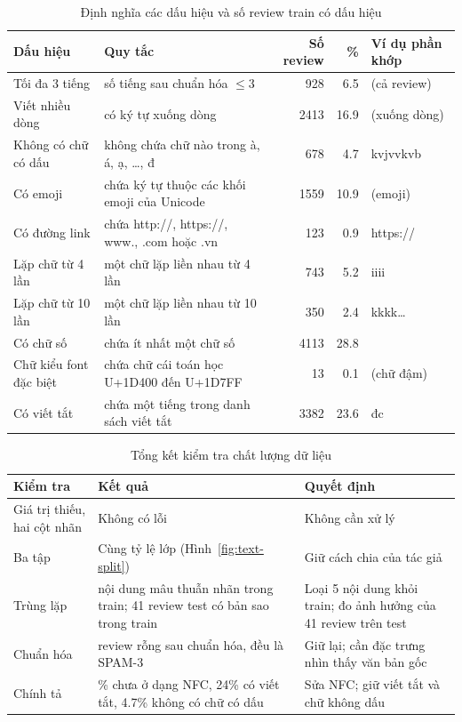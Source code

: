 \begin{table}[H]
\centering
\caption{Định nghĩa các dấu hiệu và số review train có dấu hiệu}
\label{tab:text-signals}
\small
\begin{tabular}{>{\raggedright\arraybackslash}p{3.4cm}>{\raggedright\arraybackslash}p{6.4cm}rr>{\raggedright\arraybackslash}p{2.0cm}}
\toprule
Dấu hiệu & Quy tắc & Số review & \% & Ví dụ phần khớp\\
\midrule
Tối đa 3 tiếng & số tiếng sau chuẩn hóa $\le 3$ & 928 & 6.5 & (cả review)\\
Viết nhiều dòng & có ký tự xuống dòng & 2413 & 16.9 & (xuống dòng)\\
Không có chữ có dấu & không chứa chữ nào trong à, á, ạ, \ldots, đ & 678 & 4.7 & kvjvvkvb\\
Có emoji & chứa ký tự thuộc các khối emoji của Unicode & 1559 & 10.9 & (emoji)\\
Có đường link & chứa http://, https://, www., .com hoặc .vn & 123 & 0.9 & https://\\
Lặp chữ từ 4 lần & một chữ lặp liền nhau từ 4 lần & 743 & 5.2 & iiii\\
Lặp chữ từ 10 lần & một chữ lặp liền nhau từ 10 lần & 350 & 2.4 & kkkk\ldots\\
Có chữ số & chứa ít nhất một chữ số & 4113 & 28.8 & 1\\
Chữ kiểu font đặc biệt & chứa chữ cái toán học U+1D400 đến U+1D7FF & 13 & 0.1 & (chữ đậm)\\
Có viết tắt & chứa một tiếng trong danh sách viết tắt & 3382 & 23.6 & đc\\
\bottomrule
\end{tabular}
\end{table}

\begin{table}[H]
\centering
\caption{Tổng kết kiểm tra chất lượng dữ liệu}
\label{tab:text-quality}
\small
\begin{tabular}{>{\raggedright\arraybackslash}p{3.6cm}>{\raggedright\arraybackslash}p{5.4cm}>{\raggedright\arraybackslash}p{5.4cm}}
\toprule
Kiểm tra & Kết quả & Quyết định\\
\midrule
Giá trị thiếu, hai cột nhãn & Không có lỗi & Không cần xử lý\\
Ba tập & Cùng tỷ lệ lớp (Hình~\ref{fig:text-split}) & Giữ cách chia của tác giả\\
Trùng lặp & 5 nội dung mâu thuẫn nhãn trong train; 41 review test có bản sao trong train & Loại 5 nội dung khỏi train; đo ảnh hưởng của 41 review trên test\\
Chuẩn hóa & 50 review rỗng sau chuẩn hóa, đều là SPAM-3 & Giữ lại; cần đặc trưng nhìn thấy văn bản gốc\\
Chính tả & 1.5\% chưa ở dạng NFC, 24\% có viết tắt, 4.7\% không có chữ có dấu & Sửa NFC; giữ viết tắt và chữ không dấu\\
\bottomrule
\end{tabular}
\end{table}


